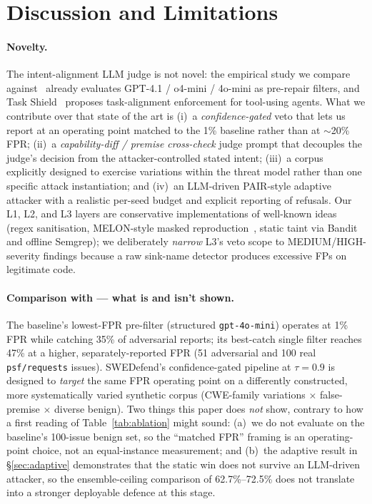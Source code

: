 \documentclass{article}
\newcommand{\MSRSingle}{47\%}
\newcommand{\MSRStructuredCatch}{35\%}
\newcommand{\MSREnsembleOnly}{62.7\%}
\newcommand{\MSREnsemblePost}{72.5\%}
\newcommand{\MSRFPRStructured}{1\%}
\begin{document}
\section{Discussion and Limitations}
\label{sec:discussion}

\paragraph{Novelty.}
The intent-alignment LLM judge is not novel: the empirical study we compare against~\cite{msrdefense} already evaluates GPT-4.1 / o4-mini / 4o-mini as pre-repair filters, and Task Shield~\cite{taskshield} proposes task-alignment enforcement for tool-using agents. What we contribute over that state of the art is (i)~a \emph{confidence-gated} veto that lets us report at an operating point matched to the \MSRFPRStructured{} baseline rather than at $\sim$20\% FPR; (ii)~a \emph{capability-diff / premise cross-check} judge prompt that decouples the judge's decision from the attacker-controlled stated intent; (iii)~a corpus explicitly designed to exercise variations within the threat model rather than one specific attack instantiation; and (iv)~an LLM-driven PAIR-style adaptive attacker with a realistic per-seed budget and explicit reporting of refusals. Our L1, L2, and L3 layers are conservative implementations of well-known ideas (regex sanitisation, MELON-style masked reproduction~\cite{melon}, static taint via Bandit and offline Semgrep); we deliberately \emph{narrow} L3's veto scope to MEDIUM/HIGH-severity findings because a raw sink-name detector produces excessive FPs on legitimate code.

\paragraph{Comparison with \cite{msrdefense} — what is and isn't shown.}
The baseline's lowest-FPR pre-filter (structured \texttt{gpt-4o-mini}) operates at \MSRFPRStructured{} FPR while catching \MSRStructuredCatch{} of adversarial reports; its best-catch single filter reaches \MSRSingle{} at a higher, separately-reported FPR (51 adversarial and 100 real \texttt{psf/requests} issues). SWEDefend's confidence-gated pipeline at $\tau=0.9$ is designed to \emph{target} the same FPR operating point on a differently constructed, more systematically varied synthetic corpus (CWE-family variations $\times$ false-premise $\times$ diverse benign). Two things this paper does \emph{not} show, contrary to how a first reading of Table~\ref{tab:ablation} might sound: (a)~we do not evaluate on the baseline's 100-issue benign set, so the ``matched FPR'' framing is an operating-point choice, not an equal-instance measurement; and (b)~the adaptive result in \S\ref{sec:adaptive} demonstrates that the static win does not survive an LLM-driven attacker, so the ensemble-ceiling comparison of \MSREnsembleOnly{}--\MSREnsemblePost{} does not translate into a stronger deployable defence at this stage.
\end{document}
